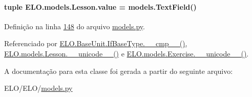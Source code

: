 \hypertarget{classELO_1_1models_1_1Lesson_a27927b9763fb13a9e41b3f826439c600}{}
\paragraph[{value}]{\setlength{\rightskip}{0pt plus 5cm}tuple E\+L\+O.\+models.\+Lesson.\+value = models.\+Text\+Field()\hspace{0.3cm}{\ttfamily [static]}}\label{classELO_1_1models_1_1Lesson_a27927b9763fb13a9e41b3f826439c600}


Definição na linha \hyperlink{ELO_2models_8py_source_l00148}{148} do arquivo \hyperlink{ELO_2models_8py_source}{models.\+py}.



Referenciado por \hyperlink{classELO_1_1BaseUnit_1_1IfBaseType_a22d6f30c4d9504a9c20d0ff5a538544d}{E\+L\+O.\+Base\+Unit.\+If\+Base\+Type.\+\_\+\+\_\+cmp\+\_\+\+\_\+()}, \hyperlink{classELO_1_1models_1_1Lesson_a53e265de97c6b73f262f62a80f9ca994}{E\+L\+O.\+models.\+Lesson.\+\_\+\+\_\+unicode\+\_\+\+\_\+()} e \hyperlink{classELO_1_1models_1_1Exercise_a23f81c66e4d6bc5a4582d74d191f5117}{E\+L\+O.\+models.\+Exercise.\+\_\+\+\_\+unicode\+\_\+\+\_\+()}.



A documentação para esta classe foi gerada a partir do seguinte arquivo\+:\begin{DoxyCompactItemize}
\item 
E\+L\+O/\+E\+L\+O/\hyperlink{ELO_2models_8py}{models.\+py}\end{DoxyCompactItemize}
